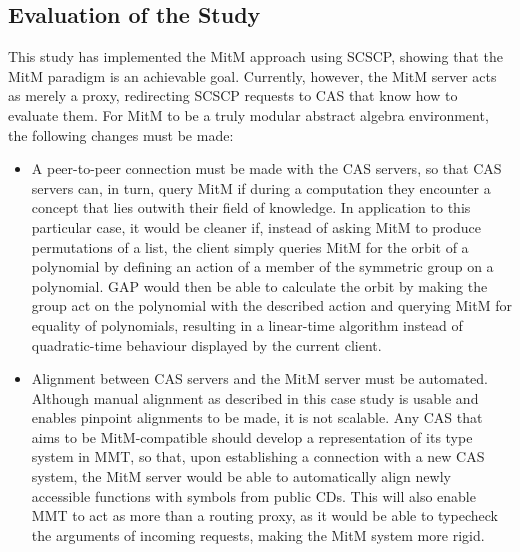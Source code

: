 \subsection{Evaluation of the Study}
This study has implemented the MitM approach using SCSCP, showing that the MitM 
paradigm is an achievable goal. Currently, however, the MitM server acts as 
merely a proxy, redirecting SCSCP requests to CAS that know how to evaluate them.
For MitM to be a truly modular abstract algebra environment, the following
changes must be made:
\begin{itemize}
  \item A peer-to-peer connection must be made with the CAS servers, so that
    CAS servers can, in turn, query MitM if during a computation they encounter 
    a concept that lies outwith their field of knowledge. In application to
    this particular case, it would be cleaner if, instead of asking MitM to 
    produce permutations of a list, the client simply queries MitM for the orbit 
    of a polynomial by defining an action of a member of the symmetric group on a 
    polynomial. GAP would then be able to calculate the orbit by making the group 
    act on the polynomial with the described action and querying MitM for 
    equality of polynomials, resulting in a linear-time algorithm instead of
    quadratic-time behaviour displayed by the current client.
  \item Alignment between CAS servers and the MitM server must be automated.
    Although manual alignment as described in this case study is usable and
    enables pinpoint alignments to be made, it is not scalable. Any CAS that aims
    to be MitM-compatible should develop a representation of its type system
    in MMT, so that, upon establishing a connection with a new CAS system, the 
    MitM server would be able to automatically align newly accessible functions 
    with symbols from public CDs. This will also enable MMT to act as more than
    a routing proxy, as it would be able to typecheck the arguments of incoming
    requests, making the MitM system more rigid.
\end{itemize}
